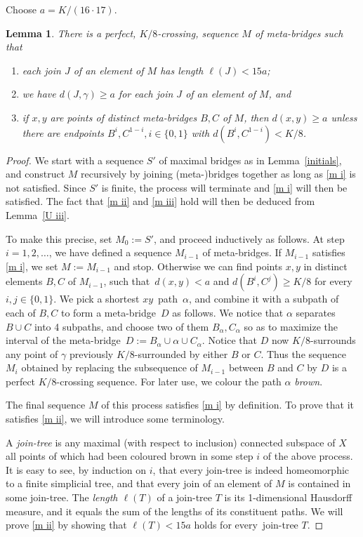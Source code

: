 \documentclass[a4paper]{article}
\newcommand{\defi}[1]{{\color{darkgray}\emph{#1}}}
\newtheorem{lemma}[proposition]{Lemma}
\newcommand{\pth}[2]{\ensuremath{#1}\text{--}\ensuremath{#2}~path}
\newcommand{\Lr}[1]{Lemma~\ref{#1}}
\newcommand{\fe}{for every}
\newcommand{\st}{such that}
\newcommand{\mb}{meta-bridge}
\begin{document}
Choose $a=  K/(16\cdot 17)$. 
\begin{lemma} \label{meta} 
There is a perfect, $K/8$-crossing, sequence $M$ of \mb s \st\
\begin{enumerate}
\item \label{m ii} each join $J$ of an element of $M$ has length $\ell(J) < 15a$; 
\item \label{m iii} we have $d(J, \gamma)\geq a$ for each join $J$ of an element of $M$, and
\item \label{m i} if $x,y$ are points of distinct \mb s $B,C$ of $M$, then $d(x,y)\geq a$ unless there are endpoints $B^i,C^{1-i}, i\in \{0,1\}$ with $d(B^i,C^{1-i})<K/8$. \end{enumerate}
\end{lemma}
\begin{proof}
We start with a sequence $S'$ of maximal bridges as in \Lr{initials}, and construct $M$ recursively by joining (meta-)bridges together as long as \ref{m i} is not satisfied. Since $S'$ is finite, the process will terminate and \ref{m i} will then be satisfied. The fact that \ref{m ii} and \ref{m iii} hold will then be deduced from \Lr{U iii}.
\smallskip

To make this precise, set $M_0:= S'$, and proceed inductively as follows. At step $i=1,2,\ldots$, we have defined a sequence $M_{i-1}$ of \mb s. If $M_{i-1}$ satisfies \ref{m i}, we set $M:= M_{i-1}$ and stop. Otherwise we can find points $x,y$ in distinct elements $B, C$ of $M_{i-1}$, \st\ $d(x,y)<a$ and $d(B^i,C^j)\geq K/8$ \fe\ $i,j\in \{0,1\}$. We pick a shortest \pth{x}{y}\ $\alpha$, and combine it with a subpath of each of $B,C$ to form a \mb\ $D$ as follows. We notice that $\alpha$ separates $B\cup C$ into 4 subpaths, and choose two of them $B_\alpha,C_\alpha$ so as to maximize the interval of the \mb\ $D:= B_\alpha \cup \alpha \cup C_\alpha$. Notice that $D$ now $K/8$-surrounds any point of $\gamma$ previously $K/8$-surrounded by either $B$ or $C$. Thus the sequence $M_i$ obtained by replacing the subsequence of $M_{i-1}$ between $B$ and $C$ by $D$ is a perfect $K/8$-crossing sequence. For later use, we colour the path $\alpha$ \defi{brown}.


\medskip
The final sequence $M$ of this process satisfies  \ref{m i} by definition. To prove that it satisfies  \ref{m ii}, we will introduce some terminology. 


A \defi{join-tree} is any maximal (with respect to inclusion) connected subspace of $X$ all points of which had been coloured brown in some step $i$ of the above process. It is easy to see, by induction on $i$, that every join-tree is indeed homeomorphic to a finite simplicial tree, and that every join of an element of $M$ is contained in some join-tree. The \defi{length $\ell(T)$} of a join-tree $T$ is its 1-dimensional Hausdorff measure, and it equals the sum of the lengths of its constituent paths. We will prove \ref{m ii} by showing that $\ell(T)< 15a$ holds \fe\ join-tree $T$.


\end{proof}
\end{document}
